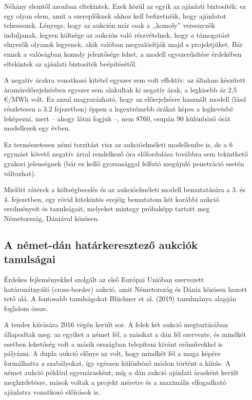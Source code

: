 \documentclass[twoside, magyar, showtrims]{corvinusphd}
\begin{document}
Néhány elemtől azonban eltekintek. Ezek közül az egyik
az ajánlati biztosíték: ez egy olyan elem, amit
a szereplőknek ahhoz kell befizetniük,
hogy ajánlatot tehessenek. Lényege, hogy
az aukción már csak a ,,komoly'' versenyzők induljanak,
legyen költsége az aukción való részvételnek, hogy
a támogatást elnyerők olyanok legyenek,
akik valóban megvalósítják majd a projektjüket.
Bár ennek a valóságban komoly jelentősége lehet, a modell egyszerűsítése
érdekében eltekintek az ajánlati biztosíték beépítésétől.

A negatív árakra vonatkozó kitétel egyszer
sem volt effektív: az általam készített áramárelőrejelzésben
egyszer sem alakultak ki negatív árak,
a legkisebb ár 2,5 €/MWh volt. Ez azzal magyarázható,
hogy az előrejelzésre használt modell
(lásd részletesen a 3.2 fejezetben) éppen a legextrémebb órákat
képes a legkevésbé leképezni, mert -- ahogy látni fogjuk --,
nem 8760, csupán 90 különböző órát modellezek egy évben.

Ez természetesen némi torzítást visz
az aukcióelméleti modellembe is, de a 6 egymást
követő negatív árral rendelkező óra előfordulása továbbra sem
tekinthető gyakori jelenségnek (bár ez kellő
gyorsasággal felfutó megújuló penetráció esetén változhat).

Mielőtt rátérek a költségbecslés és az aukcióelméleti
modell bemutatására a 3. és 4. fejezetben, egy rövid kitekintés 
erejéig bemutatom két korábbi aukció
eredményeit és tanulságait, melyeket mintegy próbaképp tartott
meg Németország, Dániával közösen.

\subsection{A német-dán határkeresztező aukciók tanulságai}

Érdekes fejleményekkel szolgált az első Európai Unióban
szervezett határonátnyúló (cross-border) aukció,
amit Németország és Dánia közösen hozott tető alá.
A fontosabb tanulságokat Blüchner et al. (2019)
tanulmánya alapján foglalom össze.

A tender kiírására 2016 végén került sor.
A felek két aukció megtartásában állapodtak meg: az egyiket a német fél,
a másikat a dán fél szervezte, és mindkét esetben lehetőség volt
a másik országban telepíteni kívánt erőművekkel is pályázni.
A dupla aukció előnye az volt, hogy mindkét fél a maga képére
formálhatta a szabályokat, így egészen különböző módon történt
a kiírás. A német aukció például egyenárasként, míg a dán aukció ajánlati árasként
került meghirdetésre, mások voltak a projekt méretre és a 
maximális elfogadható ajánlatra vonatkozó előírások is.
\end{document}
